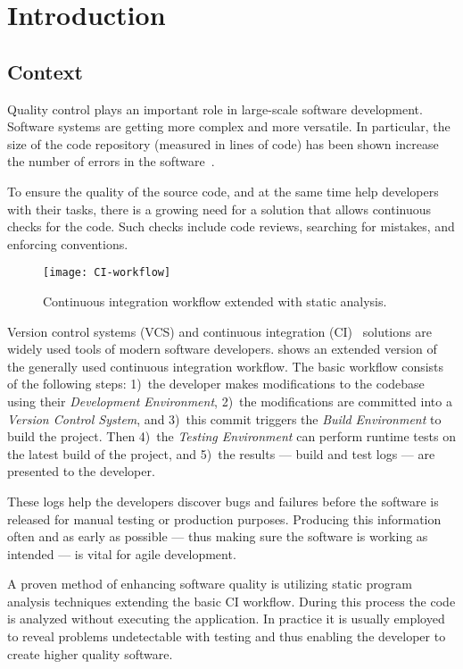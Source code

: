 \chapter{Introduction}
\label{chap:introduction}

\section{Context}
Quality control plays an important role in large-scale software development. Software systems are getting more complex and more versatile. In particular, the size of the code repository (measured in lines of code) has been shown increase the number of errors in the software~\cite{DBLP:journals/isj/StamelosAOB02}.

To ensure the quality of the source code, and at the same time help developers with their tasks, there is a growing need for a solution that allows continuous checks for the code. Such checks include code reviews, searching for mistakes, and enforcing conventions.~\cite{Vasilescu:2015:QPO:2786805.2786850}

\begin{figure}[!ht]
	\centering
	\texttt{[image: CI-workflow]}
	\caption{Continuous integration workflow extended with static analysis.}
	\label{fig:CI-workflow}
\end{figure}

Version control systems (VCS) and continuous integration (CI)~\cite{CI} solutions are widely used tools of modern software developers.  shows an extended version of the generally used continuous integration workflow.
The basic workflow consists of the following steps: 1)~the developer makes modifications to the codebase using their \textit{Development Environment}, 2)~the modifications are committed into a \textit{Version Control System}, and 3)~this commit triggers the \textit{Build Environment} to build the project. Then 4)~the \textit{Testing Environment} can perform runtime tests on the latest build of the project, and 5)~the results --- build and test logs --- are presented to the developer.

These logs help the developers discover bugs and failures before the software is released for manual testing or production purposes. Producing this information often and as early as possible --- thus making sure the software is working as intended --- is vital for agile development.

A proven method of enhancing software quality is utilizing static program analysis techniques extending the basic CI workflow. During this process the code is analyzed without executing the application. In practice it is usually employed to reveal problems undetectable with testing and thus enabling the developer to create higher quality software.


